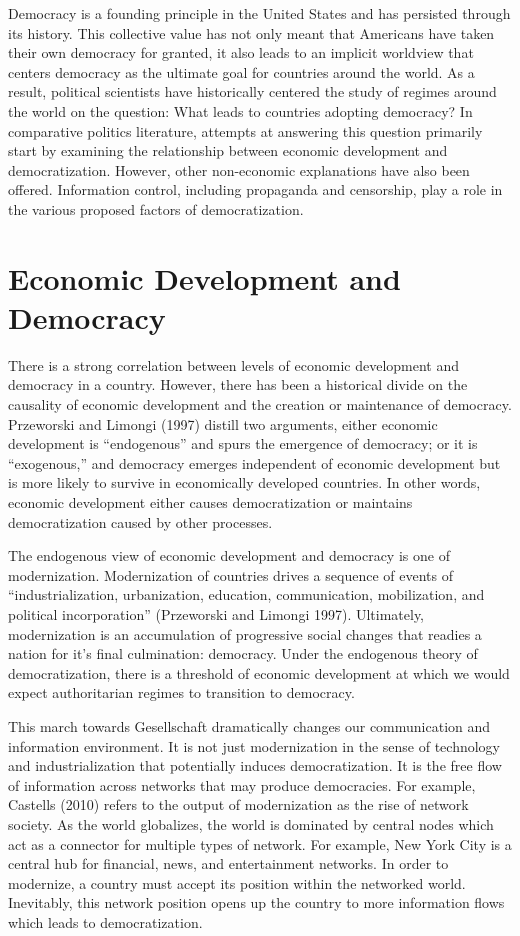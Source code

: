 \documentclass[12pt,]{article}
\begin{document}
Democracy is a founding principle in the United States and has persisted
through its history. This collective value has not only meant that
Americans have taken their own democracy for granted, it also leads to
an implicit worldview that centers democracy as the ultimate goal for
countries around the world. As a result, political scientists have
historically centered the study of regimes around the world on the
question: What leads to countries adopting democracy? In comparative
politics literature, attempts at answering this question primarily start
by examining the relationship between economic development and
democratization. However, other non-economic explanations have also been
offered. Information control, including propaganda and censorship, play
a role in the various proposed factors of democratization.

\hypertarget{economic-development-and-democracy}{%
\section{Economic Development and
Democracy}\label{economic-development-and-democracy}}

There is a strong correlation between levels of economic development and
democracy in a country. However, there has been a historical divide on
the causality of economic development and the creation or maintenance of
democracy. Przeworski and Limongi (1997) distill two arguments, either
economic development is ``endogenous'' and spurs the emergence of
democracy; or it is ``exogenous,'' and democracy emerges independent of
economic development but is more likely to survive in economically
developed countries. In other words, economic development either causes
democratization or maintains democratization caused by other processes.

The endogenous view of economic development and democracy is one of
modernization. Modernization of countries drives a sequence of events of
``industrialization, urbanization, education, communication,
mobilization, and political incorporation'' (Przeworski and Limongi
1997). Ultimately, modernization is an accumulation of progressive
social changes that readies a nation for it's final culmination:
democracy. Under the endogenous theory of democratization, there is a
threshold of economic development at which we would expect authoritarian
regimes to transition to democracy.

This march towards Gesellschaft dramatically changes our communication
and information environment. It is not just modernization in the sense
of technology and industrialization that potentially induces
democratization. It is the free flow of information across networks that
may produce democracies. For example, Castells (2010) refers to the
output of modernization as the rise of network society. As the world
globalizes, the world is dominated by central nodes which act as a
connector for multiple types of network. For example, New York City is a
central hub for financial, news, and entertainment networks. In order to
modernize, a country must accept its position within the networked
world. Inevitably, this network position opens up the country to more
information flows which leads to democratization.
\end{document}
